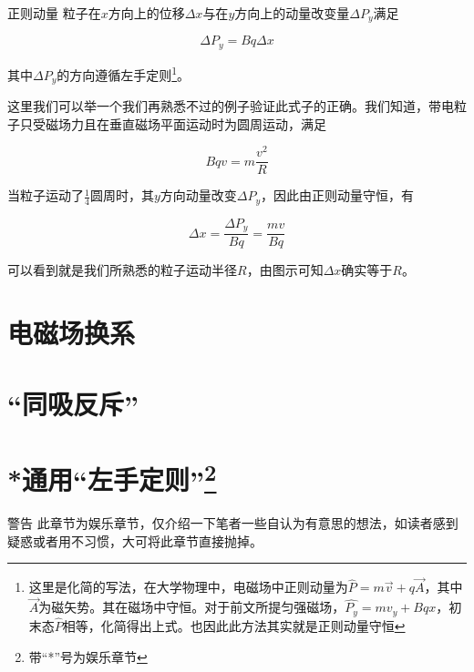 \begin{theo}{正则动量}{}
粒子在$x$方向上的位移$\Delta x$与在$y$方向上的动量改变量$\Delta P_y$满足

$$\Delta P_y = B q \Delta x$$

其中$\Delta P_y$的方向遵循左手定则\footnote{这里是化简的写法，在大学物理中，电磁场中正则动量为$\hat{P} = m \vec{v} + q \vec{A}$，其中$\vec{A}$为磁矢势。其在磁场中守恒。对于前文所提匀强磁场，$\hat{P_y} = m v_y + B q x$，初末态$\hat{P}$相等，化简得出上式。也因此此方法其实就是正则动量守恒}。

\end{theo}

这里我们可以举一个我们再熟悉不过的例子验证此式子的正确。我们知道，带电粒子只受磁场力且在垂直磁场平面运动时为圆周运动，满足

$$B q v = m \frac{v^2}{R}$$

当粒子运动了$\frac{1}{4}$圆周时，其$y$方向动量改变$\Delta P_y$，因此由正则动量守恒，有

$$\Delta x = \frac{\Delta P_y}{B q} = \frac{m v}{B q}$$

可以看到就是我们所熟悉的粒子运动半径$R$，由图示可知$\Delta x$确实等于$R$。

\section{电磁场换系}

\section{“同吸反斥”}

\section{*通用“左手定则”\protect  \footnote{带“*”号为娱乐章节}}

\begin{mk}{警告}{}
此章节为娱乐章节，仅介绍一下笔者一些自认为有意思的想法，如读者感到疑惑或者用不习惯，大可将此章节直接抛掉。
\end{mk}